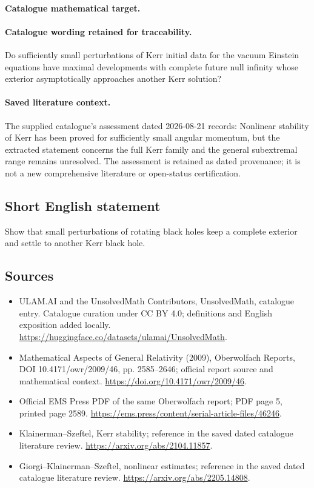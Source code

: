 \documentclass[11pt]{article}
\begin{document}
\paragraph{Catalogue mathematical target.}
\paragraph{Catalogue wording retained for traceability.}
Do sufficiently small perturbations of Kerr initial data for the vacuum Einstein equations have maximal developments with complete future null infinity whose exterior asymptotically approaches another Kerr solution?

\paragraph{Saved literature context.} The supplied catalogue's assessment dated 2026-08-21 records: Nonlinear stability of Kerr has been proved for sufficiently small angular momentum, but the extracted statement concerns the full Kerr family and the general subextremal range remains unresolved. The assessment is retained as dated provenance; it is not a new comprehensive literature or open-status certification.
\subsection{Short English statement}
Show that small perturbations of rotating black holes keep a complete exterior and settle to another Kerr black hole.
\subsection{Sources}
\begin{itemize}
\item[\hypertarget{source:statement:1}{S1}] ULAM.AI and the UnsolvedMath Contributors, UnsolvedMath, catalogue entry. Catalogue curation under CC BY 4.0; definitions and English exposition added locally.
\url{https://huggingface.co/datasets/ulamai/UnsolvedMath}.
\item[\hypertarget{source:statement:2}{S2}] Mathematical Aspects of General Relativity (2009), Oberwolfach Reports, DOI 10.4171/owr/2009/46, pp. 2585--2646; official report source and mathematical context.
\url{https://doi.org/10.4171/owr/2009/46}.
\item[\hypertarget{source:statement:3}{S3}] Official EMS Press PDF of the same Oberwolfach report; PDF page 5, printed page 2589.
\url{https://ems.press/content/serial-article-files/46246}.
\item[\hypertarget{source:statement:4}{S4}] Klainerman--Szeftel, Kerr stability; reference in the saved dated catalogue literature review.
\url{https://arxiv.org/abs/2104.11857}.
\item[\hypertarget{source:statement:5}{S5}] Giorgi--Klainerman--Szeftel, nonlinear estimates; reference in the saved dated catalogue literature review.
\url{https://arxiv.org/abs/2205.14808}.
\end{itemize}
\label{end:statement}
\end{document}
